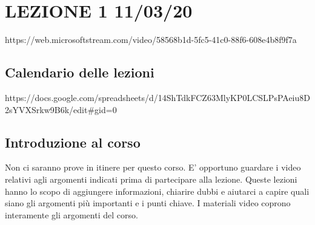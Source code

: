 \section{LEZIONE 1 11/03/20}
https://web.microsoftstream.com/video/58568b1d-5fc5-41c0-88f6-608e4b8f9f7a
\subsection{Calendario delle lezioni}
https://docs.google.com/spreadsheets/d/14ShTdkFCZ63MlyKP0LCSLPsPAeiu8D2sYVXSrkw9B6k/edit#gid=0
\subsection{Introduzione al corso}
Non ci saranno prove in itinere per questo corso.\newline
E' opportuno guardare i video relativi agli argomenti indicati prima di partecipare alla lezione.\newline
Queste lezioni hanno lo scopo di aggiungere informazioni, chiarire dubbi e aiutarci a capire quali siano gli argomenti più importanti e i punti chiave.\newline
I materiali video coprono interamente gli argomenti del corso.\newline
